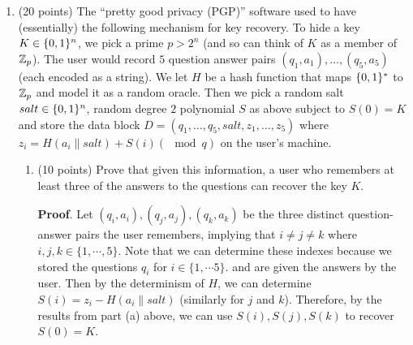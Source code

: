 \documentclass{article}
\begin{document}
\begin{enumerate}
\begin{enumerate}[,label=\alph*.]
\item{}
(20 points) The \textquotedblleft{}pretty good privacy (PGP)\textquotedblright{} software used to have (essentially) the following mechanism for key recovery. To hide a key $K\in\{0,1\}^n$, we pick a prime $p>2^n$ (and so can think of $K$ as a member of $\mathbb{Z}_p$). The user would record $5$ question answer pairs $(q_1,a_1),\ldots,(q_5,a_5)$ (each encoded as a string). We let $H$ be a hash function that maps $\{0,1\}^*$ to $\mathbb{Z}_p$ and model it as a random oracle. Then we pick a random salt $salt\in\{0,1\}^n$, random degree $2$ polynomial $S$ as above subject to $S(0)=K$ and store the data block $D=(q_1,\ldots,q_5,salt,z_1,\ldots,z_5)$ where $z_i = H(a_i\|salt)+S(i) (\mod q)$ on the user's machine.%

\begin{enumerate}[noitemsep,topsep=\mdcompacttopsep,label=\roman*.]%

\item{}(10 points) Prove that given this information, a user who remembers at least three of the answers to the questions can recover the key $K$.

\begin{mdbmarginx}{1ex}{0pt}{1ex}{0pt}%
\noindent{}\textbf{Proof}.  Let $(q_i, a_i), (q_j,a_j), (q_k,a_k)$ be the three distinct question-answer pairs the user
remembers, implying that $i \neq j \neq k$ where $i,j,k \in \{1,\cdots,5\}$. Note
that we can determine these indexes because we stored the questions $q_i$ for $i \in \{1,\cdots 5\}$.
and are given the answers by the user. Then by the determinism of $H$, we can determine
$S(i) = z_i - H(a_i \| salt)$ (similarly for $j$ and $k$). Therefore, by the results from
part (a) above, we can use $S(i),S(j),S(k)$ to recover $S(0) = K$.%
\end{mdbmarginx}%


\end{enumerate}
\end{enumerate}
\end{enumerate}
\end{document}
